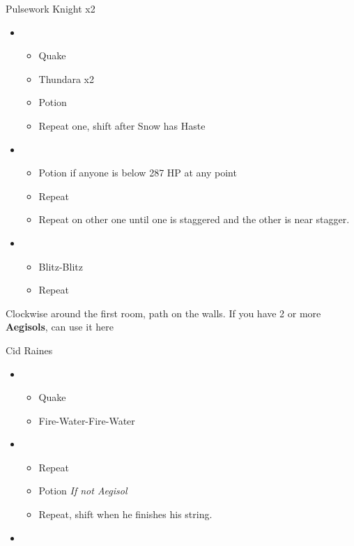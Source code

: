 \begin{multicols}{2}
\begin{battle}{Pulsework Knight x2}
\begin{itemize}
    \item \first
    \begin{itemize}
        \item Quake
        \item Thundara x2
        \item Potion
	\item Repeat one, shift after Snow has Haste
    \end{itemize}
    \item \second
    \begin{itemize}
	\item Potion if anyone is below 287 HP at any point
        \item Repeat
        \item Repeat on other one until one is staggered and the other is near stagger.
    \end{itemize}
    \item \sixth
    \begin{itemize}
        \item Blitz-Blitz
        \item Repeat
    \end{itemize}
\end{itemize}
\end{battle}
Clockwise around the first room, path on the walls.
If you have 2 or more \textbf{Aegisols}, can use it here
\begin{battle}{Cid Raines}
\begin{itemize}
    \item \first
    \begin{itemize}
        \item Quake
        \item Fire-Water-Fire-Water
    \end{itemize}
    \item \third
    \begin{itemize}
        \item Repeat
        \item Potion \textit{If not Aegisol}
        \item Repeat, shift when he finishes his string.
    \end{itemize}
    \item \fifth
    \begin{itemize}

\end{itemize}
\end{itemize}
\end{battle}
\end{multicols}
